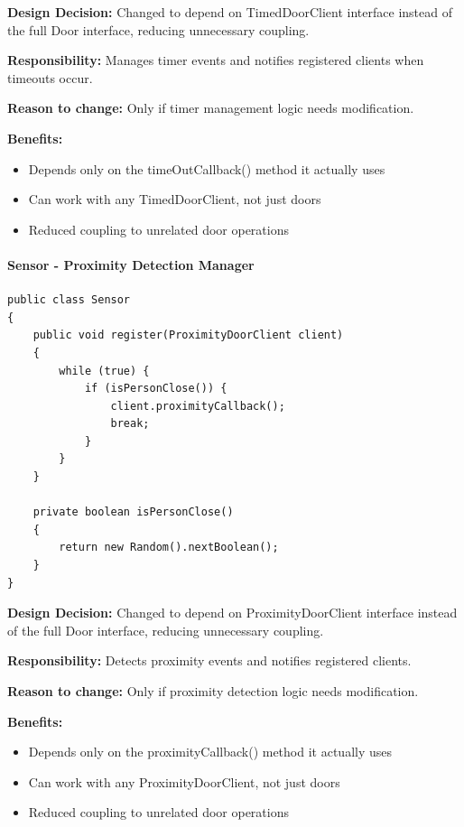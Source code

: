\textbf{Design Decision:} Changed to depend on TimedDoorClient interface instead of the full Door interface, reducing unnecessary coupling.

\textbf{Responsibility:} Manages timer events and notifies registered clients when timeouts occur.

\textbf{Reason to change:} Only if timer management logic needs modification.

\textbf{Benefits:}
\begin{itemize}
    \item Depends only on the timeOutCallback() method it actually uses
    \item Can work with any TimedDoorClient, not just doors
    \item Reduced coupling to unrelated door operations
\end{itemize}

\paragraph{Sensor - Proximity Detection Manager}

\begin{verbatim}
public class Sensor
{
    public void register(ProximityDoorClient client)
    {
        while (true) {
            if (isPersonClose()) {
                client.proximityCallback();
                break;
            }
        }
    }

    private boolean isPersonClose()
    {
        return new Random().nextBoolean();
    }
}
\end{verbatim}

\textbf{Design Decision:} Changed to depend on ProximityDoorClient interface instead of the full Door interface, reducing unnecessary coupling.

\textbf{Responsibility:} Detects proximity events and notifies registered clients.

\textbf{Reason to change:} Only if proximity detection logic needs modification.

\textbf{Benefits:}
\begin{itemize}
    \item Depends only on the proximityCallback() method it actually uses
    \item Can work with any ProximityDoorClient, not just doors
    \item Reduced coupling to unrelated door operations
\end{itemize}

